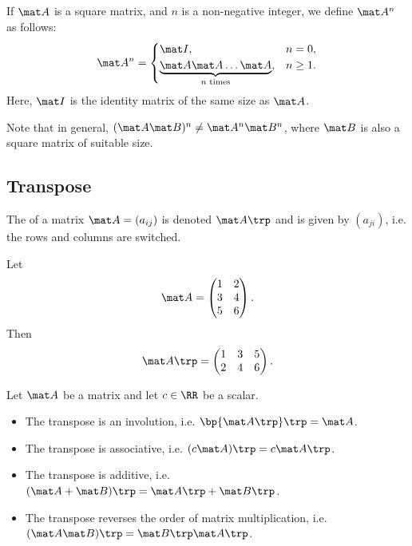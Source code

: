 \begin{definition}
    If $\mat A$ is a square matrix, and $n$ is a non-negative integer, we define $\mat A^n$ as follows: \[\mat A^n = \begin{cases}
        \mat I, & n = 0,\\
        \underbrace{\mat A \mat A \dots \mat A}_{\text{$n$ times}}, & n \geq 1.
    \end{cases}\] Here, $\mat I$ is the identity matrix of the same size as $\mat A$.
\end{definition}

Note that in general, $(\mat A \mat B)^n \neq \mat A^n \mat B^n$, where $\mat B$ is also a square matrix of suitable size.

\subsection{Transpose}

\begin{definition}
    The  of a matrix $\mat A = (a_{ij})$ is denoted $\mat A \trp$ and is given by $(a_{ji})$, i.e. the rows and columns are switched.
\end{definition}

\begin{example}
    Let \[\mat A = \begin{pmatrix}1 & 2 \\ 3 & 4 \\ 5 & 6\end{pmatrix}.\] Then \[\mat A \trp = \begin{pmatrix}1 & 3 & 5 \\ 2 & 4 & 6\end{pmatrix}.\]
\end{example}

\begin{fact}
    Let $\mat A$ be a matrix and let $c \in \RR$ be a scalar.
    \begin{itemize}
        \item The transpose is an involution, i.e. $\bp{\mat A \trp} \trp = \mat A$.
        \item The transpose is associative, i.e. $(c\mat A) \trp = c \mat A \trp$.
        \item The transpose is additive, i.e. $(\mat A + \mat B)\trp = \mat A \trp + \mat B \trp$.
        \item The transpose reverses the order of matrix multiplication, i.e. $(\mat A \mat B) \trp = \mat B \trp \mat A \trp$.
    \end{itemize}
\end{fact}

